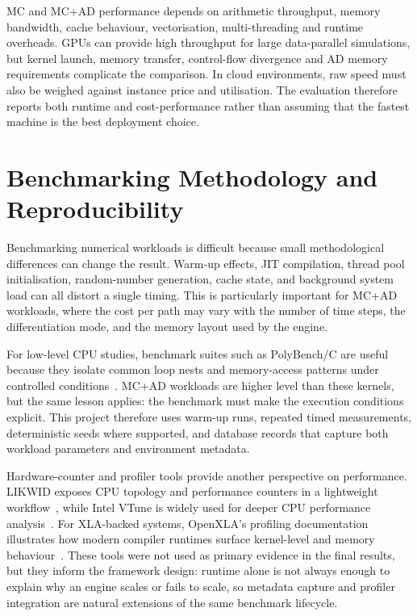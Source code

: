 MC and MC+AD performance depends on arithmetic throughput, memory bandwidth,
cache behaviour, vectorisation, multi-threading and runtime overheads. GPUs can
provide high throughput for large data-parallel simulations, but kernel launch,
memory transfer, control-flow divergence and AD memory requirements complicate
the comparison. In cloud environments, raw speed must also be weighed against
instance price and utilisation. The evaluation therefore reports both runtime
and cost-performance rather than assuming that the fastest machine is the best
deployment choice.

\section{Benchmarking Methodology and Reproducibility}

Benchmarking numerical workloads is difficult because small methodological
differences can change the result. Warm-up effects, JIT compilation, thread
pool initialisation, random-number generation, cache state, and background
system load can all distort a single timing. This is particularly important
for MC+AD workloads, where the cost per path may vary with the number of time
steps, the differentiation mode, and the memory layout used by the engine.

For low-level CPU studies, benchmark suites such as PolyBench/C are useful
because they isolate common loop nests and memory-access patterns under
controlled conditions~\cite{pouchet2012polybench}. MC+AD workloads are higher
level than these kernels, but the same lesson applies: the benchmark must make
the execution conditions explicit. This project therefore uses warm-up runs,
repeated timed measurements, deterministic seeds where supported, and database
records that capture both workload parameters and environment metadata.

Hardware-counter and profiler tools provide another perspective on
performance. LIKWID exposes CPU topology and performance counters in a
lightweight workflow~\cite{treibig2010likwid}, while Intel VTune is widely used
for deeper CPU performance analysis~\cite{intelvtune}. For XLA-backed systems,
OpenXLA's profiling documentation illustrates how modern compiler runtimes
surface kernel-level and memory behaviour~\cite{xprof2025}. These tools were
not used as primary evidence in the final results, but they inform the
framework design: runtime alone is not always enough to explain why an engine
scales or fails to scale, so metadata capture and profiler integration are
natural extensions of the same benchmark lifecycle.

